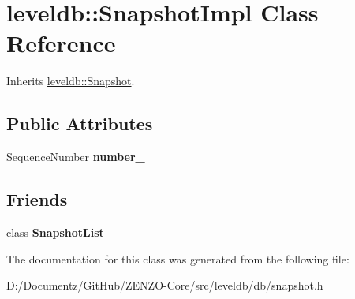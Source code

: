 \hypertarget{classleveldb_1_1_snapshot_impl}{}\section{leveldb\+::Snapshot\+Impl Class Reference}
\label{classleveldb_1_1_snapshot_impl}


Inherits \mbox{\hyperlink{classleveldb_1_1_snapshot}{leveldb\+::\+Snapshot}}.

\subsection*{Public Attributes}
\begin{DoxyCompactItemize}
\item 
\mbox{\label{classleveldb_1_1_snapshot_impl_aa31dca969679d05d17c4c0eb1443a96e}} 
Sequence\+Number {\bfseries number\+\_\+}
\end{DoxyCompactItemize}
\subsection*{Friends}
\begin{DoxyCompactItemize}
\item 
\mbox{\label{classleveldb_1_1_snapshot_impl_abe14b2fb5e32159324c619e1a42327a0}} 
class {\bfseries Snapshot\+List}
\end{DoxyCompactItemize}


The documentation for this class was generated from the following file\+:\begin{DoxyCompactItemize}
\item 
D\+:/\+Documentz/\+Git\+Hub/\+Z\+E\+N\+Z\+O-\/\+Core/src/leveldb/db/snapshot.\+h\end{DoxyCompactItemize}
